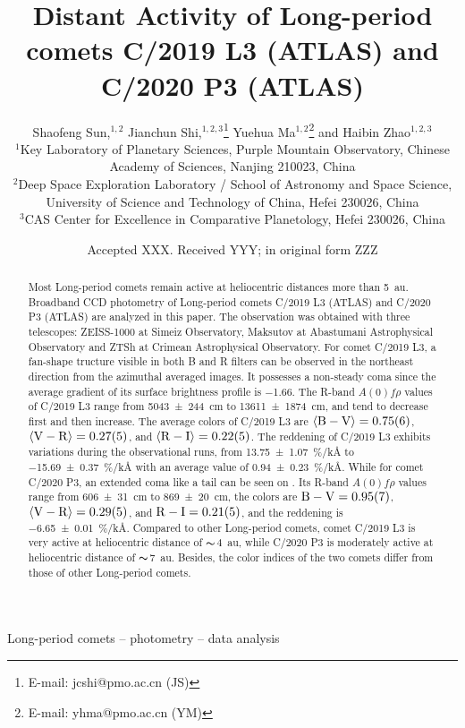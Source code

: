 \documentclass[fleqn,usenatbib]{mnras}
\title[Distant Activity of C/2019 L3 and C/2020 P3]{Distant Activity of Long-period comets C/2019 L3 (ATLAS) and C/2020 P3 (ATLAS)}
\author[Shaofeng Sun et al.]{
Shaofeng Sun,$^{1,2}$
Jianchun Shi,$^{1,2,3}$\thanks{E-mail: jcshi@pmo.ac.cn (JS)}
Yuehua Ma$^{1,2}$\thanks{E-mail: yhma@pmo.ac.cn (YM)}
and Haibin Zhao$^{1,2,3}$
\\
$^{1}$Key Laboratory of Planetary Sciences, Purple Mountain Observatory, Chinese Academy of Sciences, Nanjing 210023, China\\
$^{2}$Deep Space Exploration Laboratory / School of Astronomy and Space Science, University of Science and Technology of China, Hefei 230026, China\\
$^{3}$CAS Center for Excellence in Comparative Planetology, Hefei 230026, China
}
\date{Accepted XXX. Received YYY; in original form ZZZ}
\begin{document}
\label{firstpage}
\pagerange{\pageref{firstpage}--\pageref{lastpage}}
\maketitle


\begin{abstract}
	Most Long-period comets remain active at  heliocentric distances more than {\SI{5}{\astronomicalunit}}. Broadband CCD photometry of Long-period comets C/2019 L3 (ATLAS) and C/2020 P3 (ATLAS) are analyzed in this paper.
	The observation was obtained with three telescopes: ZEISS-1000 at Simeiz Observatory, Maksutov at Abastumani Astrophysical Observatory and ZTSh at Crimean Astrophysical Observatory. For comet C/2019 L3, a fan-shape tructure visible in both B and R filters can be observed in the northeast direction from the azimuthal averaged images. It possesses a non-steady coma since the average gradient of its surface brightness profile is \num{-1.66}. The R-band $A(0)f\rho$ values of C/2019 L3 range from {\SI{5043 +- 244}{\cm}} to {\SI{13611 +- 1874}{\cm}}, and tend to decrease first and then increase. The average colors of C/2019 L3 are $\langle \mathrm{B-V} \rangle = \num{0.75 +- 0.06}$, $\langle \mathrm{V-R} \rangle = \num{0.27 +- 0.05}$, and $\langle \mathrm{R-I} \rangle = \num{0.22 +- 0.05}$. The reddening of C/2019 L3 exhibits variations during the observational runs, from {\SI{13.75 +- 1.07}{\percent/\kilo\angstrom}} to {\SI{-15.69 +- 0.37}{\percent/\kilo\angstrom}} with an average value of {\SI{0.94 +- 0.23}{\percent/\kilo\angstrom}}. While for comet C/2020 P3, an extended coma like a tail can be seen on . Its R-band $A(0)f\rho$ values range from {\SI{606 +- 31}{\cm}} to {\SI{869 +- 20}{\cm}}, the colors are $\mathrm{B-V} = \num{0.95 +- 0.07}$, $\langle \mathrm{V-R} \rangle = \num{0.29 +- 0.05}$, and $\mathrm{R-I} = \num{0.21 +- 0.05}$, and the reddening is {\SI{-6.65 +- 0.01}{\percent/\kilo\angstrom}}. Compared to other Long-period comets, comet C/2019 L3 is very active at heliocentric distance of $\thicksim${\qty{4}{\astronomicalunit}}, while C/2020 P3 is moderately active at heliocentric distance of $\thicksim${\qty{7}{\astronomicalunit}}. Besides, the color indices of the two comets differ from those of other Long-period comets. 
\end{abstract}

\begin{keywords}
Long-period comets -- photometry -- data analysis
\end{keywords}
\end{document}
